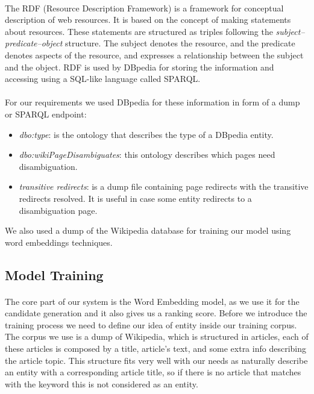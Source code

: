 \paragraph{}
The RDF (Resource Description Framework) is a framework for conceptual description of web resources. It is based on the concept of making statements about resources. These statements are structured as triples following the \textit{subject–predicate–object} structure. The subject denotes the resource, and the predicate denotes aspects of the resource, and expresses a relationship between the subject and the object. RDF is used by DBpedia for storing the information and accessing using a SQL-like language called SPARQL.

\paragraph{}
For our requirements we used DBpedia for these information in form of a dump or SPARQL endpoint:

\begin{itemize}[itemsep = 0.1em]
\item \textit{dbo:type}: is the ontology that describes the type of a DBpedia entity.
\item \textit{dbo:wikiPageDisambiguates}: this ontology describes which pages need disambiguation.
\item \textit{transitive redirects}: is a dump file containing page redirects with the transitive redirects resolved. It is useful in case some entity redirects to a disambiguation page.
\end{itemize} 
We also used a dump of the Wikipedia database for training our model using word embeddings techniques.

\subsection{Model Training}
\paragraph{}
The core part of our system is the Word Embedding model, as we use it for the candidate generation and it also gives us a ranking score. Before we introduce the training process we need to define our idea of entity inside our training corpus. The corpus we use is a dump of Wikipedia, which is structured in articles, each of these articles is composed by a title, article's text, and some extra info describing the article topic. This structure fits very well with our needs as naturally describe an entity with a corresponding article title, so if there is no article that matches with the keyword this is not considered as an entity.

